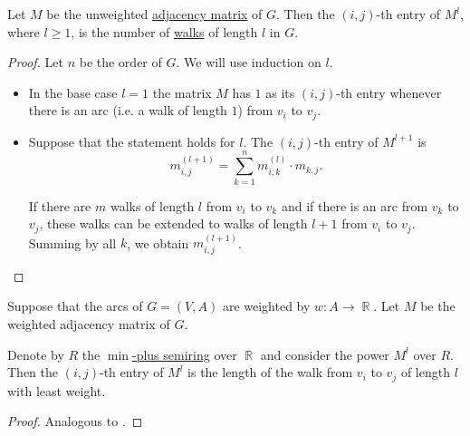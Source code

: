 \begin{proposition}\label{thm:adjacency_matrix_power}
  Let \( M \) be the unweighted \hyperref[def:graph_adjacency_matrix]{adjacency matrix} of \( G \). Then the \( (i, j) \)-th entry of \( M^l \), where \( l \geq 1 \), is the number of \hyperref[def:graph_walk]{walks} of length \( l \) in \( G \).
\end{proposition}
\begin{proof}
  Let \( n \) be the order of \( G \). We will use induction on \( l \).
  \begin{itemize}
    \item In the base case \( l = 1 \) the matrix \( M \) has \( 1 \) as its \( (i,j) \)-th entry whenever there is an arc (i.e. a walk of length \( 1 \)) from \( v_i \) to \( v_j \).

    \item Suppose that the statement holds for \( l \). The \( (i, j) \)-th entry of \( M^{l+1} \) is
    \begin{equation*}
      m^{(l+1)}_{i,j} = \sum_{k=1}^n m^{(l)}_{i,k} \cdot m_{k,j}.
    \end{equation*}

    If there are \( m \) walks of length \( l \) from \( v_i \) to \( v_k \) and if there is an arc from \( v_k \) to \( v_j \), these walks can be extended to walks of length \( l + 1 \) from \( v_i \) to \( v_j \). Summing by all \( k \), we obtain \( m^{(l+1)}_{i,j} \).
  \end{itemize}
\end{proof}

\begin{proposition}\label{thm:adjacency_matrix_tropical_power}
  Suppose that the arcs of \( G = (V, A) \) are weighted by \( w: A \to \BbbR \). Let \( M \) be the weighted adjacency matrix of \( G \).

  Denote by \( R \) the \hyperref[def:tropical_semiring]{\( \min \)-plus semiring} over \( \BbbR \) and consider the power \( M^l \) over \( R \). Then the \( (i, j) \)-th entry of \( M^l \) is the length of the walk from \( v_i \) to \( v_j \) of length \( l \) with least weight.
\end{proposition}
\begin{proof}
  Analogous to .
\end{proof}


